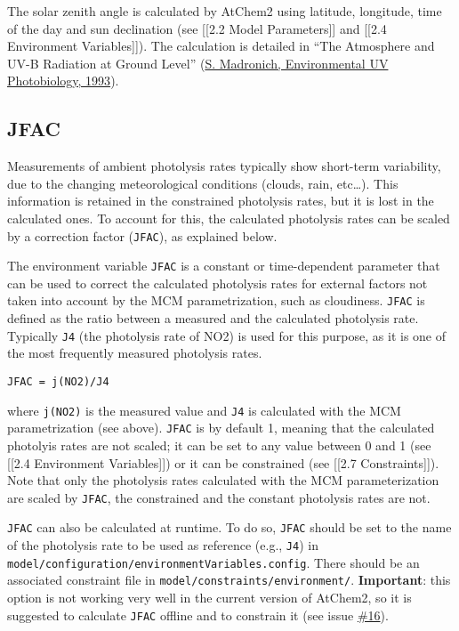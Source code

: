 The solar zenith angle is calculated by AtChem2 using latitude,
longitude, time of the day and sun declination (see {[}{[}2.2 Model
Parameters{]}{]} and {[}{[}2.4 Environment Variables{]}{]}). The
calculation is detailed in ``The Atmosphere and UV-B Radiation at Ground
Level'' (\href{https://doi.org//10.1007/978-1-4899-2406-3_1}{S.
Madronich, Environmental UV Photobiology, 1993}).

\subsection{JFAC}\label{jfac}

Measurements of ambient photolysis rates typically show short-term
variability, due to the changing meteorological conditions (clouds,
rain, etc\ldots{}). This information is retained in the constrained
photolysis rates, but it is lost in the calculated ones. To account for
this, the calculated photolysis rates can be scaled by a correction
factor (\texttt{JFAC}), as explained below.

The environment variable \texttt{JFAC} is a constant or time-dependent
parameter that can be used to correct the calculated photolysis rates
for external factors not taken into account by the MCM parametrization,
such as cloudiness. \texttt{JFAC} is defined as the ratio between a
measured and the calculated photolysis rate. Typically \texttt{J4} (the
photolysis rate of NO2) is used for this purpose, as it is one of the
most frequently measured photolysis rates.

\begin{verbatim}
JFAC = j(NO2)/J4
\end{verbatim}

where \texttt{j(NO2)} is the measured value and \texttt{J4} is
calculated with the MCM parametrization (see above). \texttt{JFAC} is by
default 1, meaning that the calculated photolyis rates are not scaled;
it can be set to any value between 0 and 1 (see {[}{[}2.4 Environment
Variables{]}{]}) or it can be constrained (see {[}{[}2.7
Constraints{]}{]}). Note that only the photolysis rates calculated with
the MCM parameterization are scaled by \texttt{JFAC}, the constrained
and the constant photolysis rates are not.

\texttt{JFAC} can also be calculated at runtime. To do so, \texttt{JFAC}
should be set to the name of the photolysis rate to be used as reference
(e.g., \texttt{J4}) in
\texttt{model/configuration/environmentVariables.config}. There should
be an associated constraint file in
\texttt{model/constraints/environment/}. \textbf{Important}: this option
is not working very well in the current version of AtChem2, so it is
suggested to calculate \texttt{JFAC} offline and to constrain it (see
issue \href{https://github.com/AtChem/AtChem2/issues/16}{\#16}).
